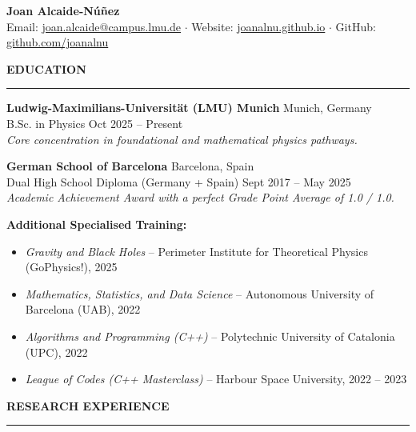 \documentclass[10pt,a4paper]{article}
\newcommand{\cvsection}[1]{%
    \vspace{14pt}
    {\large\bfseries\MakeUppercase{#1}}
    \vspace{2pt}\hrule\vspace{6pt}
}
\begin{document}
\begin{center}
    {\LARGE \bfseries Joan Alcaide-Núñez} \\[4pt]
    \small
    Email: \href{mailto:joan.alcaide@campus.lmu.de}{joan.alcaide@campus.lmu.de} $\cdot$
    Website: \href{https://joanalnu.github.io}{joanalnu.github.io} $\cdot$
    GitHub: \href{https://github.com/joanalnu}{github.com/joanalnu}
\end{center}

\cvsection{Education}

\textbf{Ludwig-Maximilians-Universität (LMU) Munich} \hfill Munich, Germany \\
B.Sc. in Physics \hfill Oct 2025 -- Present \\
\textit{Core concentration in foundational and mathematical physics pathways.}

\vspace{6pt}

\textbf{German School of Barcelona} \hfill Barcelona, Spain \\
Dual High School Diploma (Germany + Spain) \hfill Sept 2017 -- May 2025 \\
\textit{Academic Achievement Award with a perfect Grade Point Average of 1.0 / 1.0.}

\vspace{6pt}

\textbf{Additional Specialised Training:}
\begin{itemize}
    \itemsep0em   
    \item \textit{Gravity and Black Holes} -- Perimeter Institute for Theoretical Physics (GoPhysics!), 2025
    \item \textit{Mathematics, Statistics, and Data Science} -- Autonomous University of Barcelona (UAB), 2022
    \item \textit{Algorithms and Programming (C++)} -- Polytechnic University of Catalonia (UPC), 2022
    \item \textit{League of Codes (C++ Masterclass)} -- Harbour Space University, 2022 -- 2023
\end{itemize}

\cvsection{Research Experience}
\end{document}
